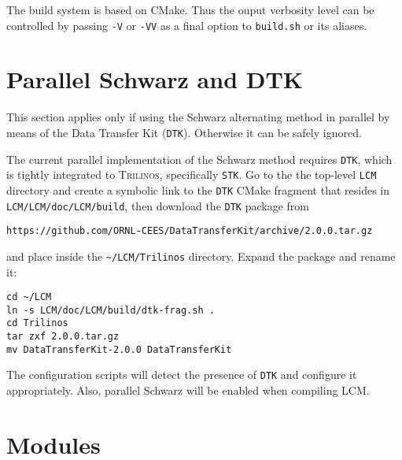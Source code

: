 \documentclass{article}
\newcommand{\trilinos}{\textsc{Trilinos}}
\begin{document}
The build system is based on CMake. Thus the ouput verbosity level can be
controlled by passing \verb+-V+ or \verb+-VV+ as a final option to
\verb+build.sh+ or its aliases.

\section{Parallel Schwarz and DTK}
\label{sec:dtk}

This section applies only if using the Schwarz alternating method in parallel by
means of the Data Transfer Kit (\verb+DTK+).  Otherwise it can be safely
ignored.

The current parallel implementation of the Schwarz method requires \verb+DTK+,
which is tightly integrated to \trilinos{}, specifically \verb+STK+. Go to the
the top-level \verb+LCM+ directory and create a symbolic link to the \verb+DTK+
CMake fragment that resides in \verb+LCM/LCM/doc/LCM/build+, then download
the \verb+DTK+ package from

\begin{verbatim}
https://github.com/ORNL-CEES/DataTransferKit/archive/2.0.0.tar.gz
\end{verbatim}

\noindent
and place inside the \verb+~/LCM/Trilinos+ directory. Expand the package and
rename it:
\begin{verbatim}
cd ~/LCM
ln -s LCM/doc/LCM/build/dtk-frag.sh .
cd Trilinos
tar zxf 2.0.0.tar.gz
mv DataTransferKit-2.0.0 DataTransferKit
\end{verbatim}
The configuration scripts will detect the presence of \verb+DTK+ and
configure it appropriately. Also, parallel Schwarz will be enabled when
compiling LCM.

\section{Modules}
\label{sec:modules}
\end{document}
